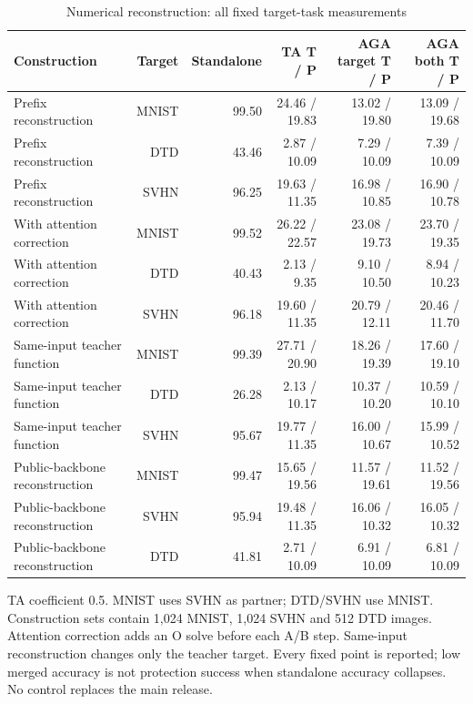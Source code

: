 \begin{table}[!htbp]
\centering
\small
\caption{Numerical reconstruction: all fixed target-task measurements}
\label{tab:numerical_reconstruction}
\begin{tabular}{lrrrrr}
\toprule
Construction & Target & Standalone & TA T / P & AGA target T / P & AGA both T / P \\
\midrule
Prefix reconstruction & MNIST & 99.50 & 24.46 / 19.83 & 13.02 / 19.80 & 13.09 / 19.68 \\
Prefix reconstruction & DTD & 43.46 & 2.87 / 10.09 & 7.29 / 10.09 & 7.39 / 10.09 \\
Prefix reconstruction & SVHN & 96.25 & 19.63 / 11.35 & 16.98 / 10.85 & 16.90 / 10.78 \\
With attention correction & MNIST & 99.52 & 26.22 / 22.57 & 23.08 / 19.73 & 23.70 / 19.35 \\
With attention correction & DTD & 40.43 & 2.13 / 9.35 & 9.10 / 10.50 & 8.94 / 10.23 \\
With attention correction & SVHN & 96.18 & 19.60 / 11.35 & 20.79 / 12.11 & 20.46 / 11.70 \\
Same-input teacher function & MNIST & 99.39 & 27.71 / 20.90 & 18.26 / 19.39 & 17.60 / 19.10 \\
Same-input teacher function & DTD & 26.28 & 2.13 / 10.17 & 10.37 / 10.20 & 10.59 / 10.10 \\
Same-input teacher function & SVHN & 95.67 & 19.77 / 11.35 & 16.00 / 10.67 & 15.99 / 10.52 \\
Public-backbone reconstruction & MNIST & 99.47 & 15.65 / 19.56 & 11.57 / 19.61 & 11.52 / 19.56 \\
Public-backbone reconstruction & SVHN & 95.94 & 19.48 / 11.35 & 16.06 / 10.32 & 16.05 / 10.32 \\
Public-backbone reconstruction & DTD & 41.81 & 2.71 / 10.09 & 6.91 / 10.09 & 6.81 / 10.09 \\
\bottomrule
\end{tabular}
\par\vspace{3pt}\begin{minipage}{0.98\linewidth}\footnotesize TA coefficient 0.5. MNIST uses SVHN as partner; DTD/SVHN use MNIST. Construction sets contain 1,024 MNIST, 1,024 SVHN and 512 DTD images. Attention correction adds an O solve before each A/B step. Same-input reconstruction changes only the teacher target. Every fixed point is reported; low merged accuracy is not protection success when standalone accuracy collapses. No control replaces the main release.\end{minipage}
\end{table}

